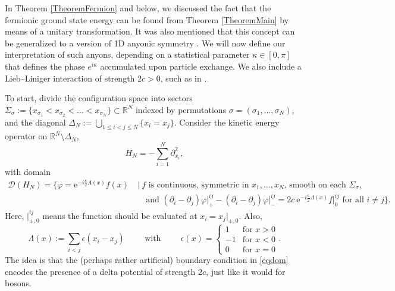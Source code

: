 \documentclass[a4paper,11pt]{article}
\newcommand{\euler}[1]{\text{e}^{#1}}
\newcommand{\R}{\mathbb{R}}
\numberwithin{equation}{section}
\begin{document}
In Theorem \ref{TheoremFermion} and below, we discussed the fact that the fermionic ground state energy can be found from Theorem \ref{TheoremMain} by means of a unitary transformation. It was also mentioned that this concept can be generalized to a version of 1D anyonic symmetry \cite{leinaas1977theory,bonkhoff2021bosonic,posske2017second}. We will now define our interpretation of such anyons, depending on a statistical parameter $\kappa\in[0,\pi]$ that defines the phase $e^{i\kappa}$ accumulated upon particle exchange. We also include a Lieb--Liniger interaction of strength $2c>0$, such as in \cite{kundu1999exact,hao2008ground,batchelor2006one}.

To start, divide the configuration space into sectors $ \Sigma_\sigma:=\{x_{\sigma_1}<x_{\sigma_2}<\dots<x_{\sigma_N}\}\subset \R^N $ indexed by permutations $ \sigma=(\sigma_1,\dots,\sigma_N) $, and the diagonal 
$\Delta_N:=\bigcup_{1\leq i<j\leq N}\{x_i=x_j\}$. Consider the kinetic energy operator on $\R^N\setminus\Delta_N$,
\begin{equation}
H_N=-\sum_{i=1}^{N}\partial_{x_i}^2,
\end{equation}
with domain \begin{equation}
\label{eqdom}
\begin{aligned}
\mathcal{D}(H_N)=\bigg\{\varphi=\euler{-i\frac{\kappa}{2}\Lambda(x)}f(x)&\ \bigg\vert\ f \text{ is continuous, symmetric in $x_1,\dots,x_N$, smooth on each $\Sigma_\sigma$,}\\&\quad \ \text{and } (\partial_i-\partial_j)\varphi\rvert^{ij}_+-(\partial_i-\partial_j)\varphi\rvert^{ij}_-=2c\ \euler{-i\frac{\kappa}{2}\Lambda(x)} f\rvert^{ij}_0 \text{ for all }i\neq j \bigg\}.
\end{aligned}
\end{equation}
Here, $ \vert^{ij}_{\pm,0} $ means the function should be evaluated at $ x_i=x_j\vert_{ \pm,0}$. Also, 
\begin{equation}
\Lambda(x):= \sum_{i<j}\epsilon(x_i-x_j)\hspace{1cm}\text{with}\hspace{1cm} \epsilon(x)=\begin{cases}
			1&\text{for }x>0\\
			-1&\text{for }x<0\\
			0&\text{for }x=0
			\end{cases}.
\end{equation} The idea is that the (perhaps rather artificial) boundary condition in \eqref{eqdom} encodes the presence of a delta potential of strength $2c$, just like it would for bosons. 
\end{document}
